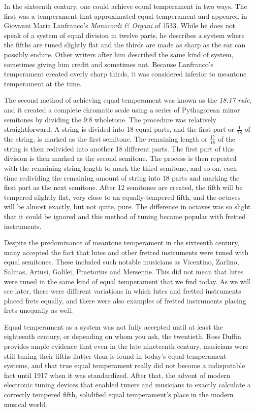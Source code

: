In the sixteenth century, one could achieve equal temperament in two ways.  The first was
a temperament that approximated equal temperament and appeared in Giovanni Maria
Lanfranco's \textit{Monocordi \& Organi} of 1533. While he does not speak of a system of
equal division in twelve parts, he describes a system where the fifths are tuned slightly
flat and the thirds are made as sharp as the ear can possibly endure. \autocite[45]{MB:1}
Other writers after him described the same kind of system, sometimes giving him credit and
sometimes not.  Because Lanfranco's temperament created overly sharp thirds, it was
considered inferior to meantone temperament at the time.

The second method of achieving equal temperament was known as the \textit{18:17 rule}, and
it created a complete chromatic scale using a series of Pythagorean minor semitones by
dividing the 9:8 wholetone.  The procedure was relatively straightforward.  A string is
divided into 18 equal parts, and the first part or $ \frac{1}{18} $ of the string, is
marked as the first semitone.  The remaining length or $ \frac{17}{18} $ of the string is
then redivided into another 18 different parts.  The first part of this division is then
marked as the second semitone.  The process is then repeated with the remaining string
length to mark the third semitone, and so on, each time redividing the remaining amount of
string into 18 parts and marking the first part as the next semitone.  After 12 semitones
are created, the fifth will be tempered slightly flat, very close to an equally-tempered
fifth, and the octaves will be almost exactly, but not quite, pure.  The difference in
octaves was so slight that it could be ignored and this method of tuning became popular
with fretted instruments.

Despite the predominance of meantone temperament in the sixteenth century, many accepted
the fact that lutes and other fretted instruments were tuned with equal semitones.  These
included such notable musicians as Vicentino, Zarlino, Salinas, Artusi, Galilei,
Praetorius and Mersenne. \autocite[19]{ML:1} This did not mean that lutes were tuned in
the same kind of equal temperament that we find today. As we will see later, there were
different variations in which lutes and fretted instruments placed frets equally, and
there were also examples of fretted instruments placing frets unequally as well.

Equal temperament as a system was not fully accepted until at least the eighteenth
century, or depending on whom you ask, the twentieth.  Ross Duffin provides ample evidence
that even in the late nineteenth century, musicians were still tuning their fifths flatter
than is found in today's equal temperament systems, and that true equal temperament really
did not become a indisputable fact until 1917 when it was standardized.
\autocite[138]{RD:1}  After that, the advent of modern electronic tuning devices that
enabled tuners and musicians to exactly calculate a correctly tempered fifth, solidified
equal temperament's place in the modern musical world.

